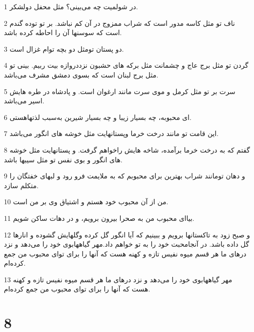 \par 1 در شولمیت چه می‌بینی؟ مثل محفل دولشکر.
\par 2 ناف تو مثل کاسه مدور است که شراب ممزوج در آن کم نباشد. بر تو توده گندم است که سوسنها آن را احاطه کرده باشد.
\par 3 دو پستان تومثل دو بچه توام غزال است.
\par 4 گردن تو مثل برج عاج و چشمانت مثل برکه های حشبون نزددروازه بیت ربیم. بینی تو مثل برج لبنان است که بسوی دمشق مشرف می‌باشد.
\par 5 سرت بر تو مثل کرمل و موی سرت مانند ارغوان است. و پادشاه در طره هایش اسیر می‌باشد. 
\par 6 ‌ای محبوبه، چه بسیار زیبا و چه بسیار شیرین به‌سبب لذتهاهستی.
\par 7 این قامت تو مانند درخت خرما وپستانهایت مثل خوشه های انگور می‌باشد.
\par 8 گفتم که به درخت خرما برآمده، شاخه هایش راخواهم گرفت. و پستانهایت مثل خوشه های انگور و بوی نفس تو مثل سیبها باشد.
\par 9 و دهان تومانند شراب بهترین برای محبوبم که به ملایمت فرو رود و لبهای خفتگان را متکلم سازد.
\par 10 من از آن محبوب خود هستم و اشتیاق وی بر من است.
\par 11 بیا‌ای محبوب من به صحرا بیرون برویم، و در دهات ساکن شویم.
\par 12 و صبح زود به تاکستانها برویم و ببینیم که آیا انگور گل کرده وگلهایش گشوده و انارها گل داده باشد. در آنجامحبت خود را به تو خواهم داد.مهر گیاههابوی خود را می‌دهد و نزد درهای ما هر قسم میوه نفیس تازه و کهنه هست که آنها را برای تو‌ای محبوب من جمع کرده‌ام.
\par 13 مهر گیاههابوی خود را می‌دهد و نزد درهای ما هر قسم میوه نفیس تازه و کهنه هست که آنها را برای تو‌ای محبوب من جمع کرده‌ام.
 
\chapter{8}

